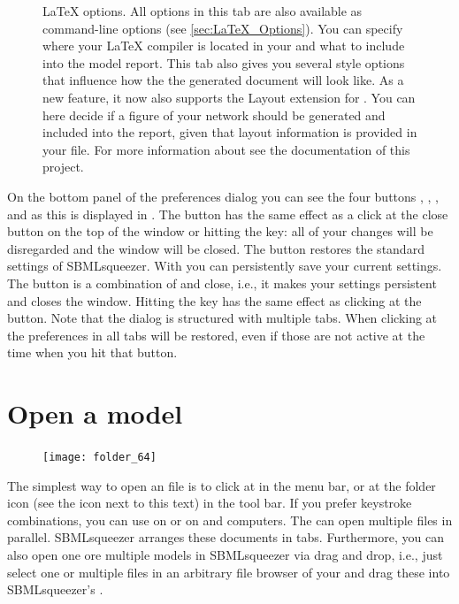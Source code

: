 \begin{figure}
\caption[\LaTeX{} options]{\LaTeX{} options.
All options in this tab are also available as command-line options
(see \vref{sec:LaTeX_Options}).
You can specify where your \LaTeX{} compiler is located in your \OS and what
to include into the model report.
This tab also gives you several style options that influence how the
the generated document will look like.
As a new feature, it now also supports the Layout extension for \SBML
\citep{Gauges2006}.
You can here decide if a figure of your network should be generated and
included into the report, given that layout information is provided in your file.
For more information about \SBMLLaTeX see the documentation of this project.}
\label{fig:LaTeX_Options}
\end{figure}
On the bottom panel of the preferences dialog you can see the four buttons
, , , and  as this is displayed in
.
The  button has the same effect as a click at the close button on the
top of the window or hitting the \keys{\escwin} key: all of your changes will be
disregarded and the window will be closed.
The  button restores the standard settings of SBMLsqueezer.
With  you can persistently save your current settings.
The  button is a combination of  and close, i.e., it makes your
settings persistent and closes the window.
Hitting the \keys{\return} key has the same effect as clicking at the  button.
Note that the dialog is structured with multiple tabs. When clicking at
 the preferences in all tabs will be restored, even if those are not
active at the time when you hit that button.


\section{Open a model}

\begin{figure}
\vspace{\wrapfigspace}
\texttt{[image: folder\_64]}
\end{figure}
The simplest way to open an \SBML file is to click at  in the
menu bar, or at the folder icon (see the icon next to this text) in the tool bar.
If you prefer keystroke combinations, you can use  on \MacOSX or
 on \Windows and \Linux computers.
The \GUI can open multiple \SBML files in parallel.
SBMLsqueezer arranges these \SBML documents in tabs.
Furthermore, you can also open one ore multiple models in SBMLsqueezer via drag and drop, i.e., just select one or multiple \SBML files in an arbitrary file browser of your \OS and drag these into SBMLsqueezer's \GUI.

